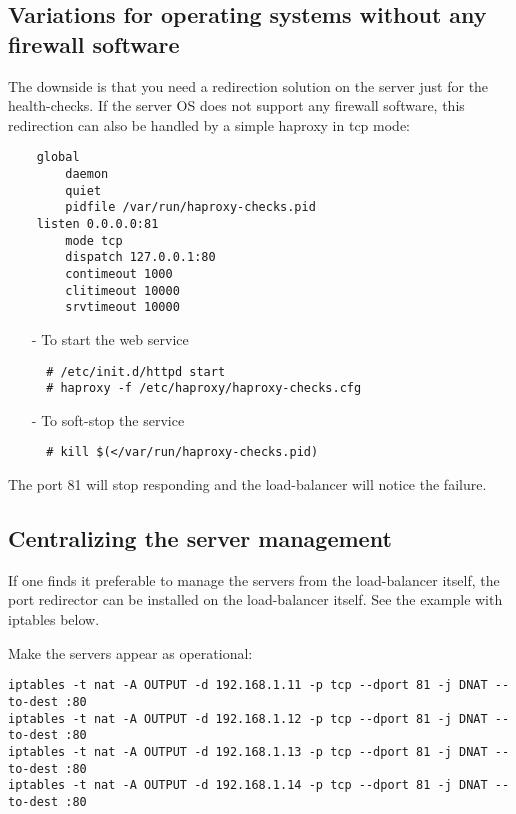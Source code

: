 \subsection{Variations for operating systems without any firewall software}

The downside is that you need a redirection solution on the server just for
the health-checks. If the server OS does not support any firewall software,
this redirection can also be handled by a simple haproxy in tcp mode:

\begin{verbatim}
    global
        daemon
        quiet
        pidfile /var/run/haproxy-checks.pid
    listen 0.0.0.0:81
        mode tcp
        dispatch 127.0.0.1:80
        contimeout 1000
        clitimeout 10000
        srvtimeout 10000
\end{verbatim}

\begin{itemize}
\item[-] To start the web service
\begin{verbatim}
  # /etc/init.d/httpd start
  # haproxy -f /etc/haproxy/haproxy-checks.cfg
\end{verbatim}
\item[-] To soft-stop the service
\begin{verbatim}
  # kill $(</var/run/haproxy-checks.pid)
\end{verbatim}
\end{itemize}

The port 81 will stop responding and the load-balancer will notice the failure.

\subsection{Centralizing the server management}

If one finds it preferable to manage the servers from the load-balancer itself,
the port redirector can be installed on the load-balancer itself. See the
example with iptables below.

Make the servers appear as operational:
\begin{verbatim}
iptables -t nat -A OUTPUT -d 192.168.1.11 -p tcp --dport 81 -j DNAT --to-dest :80
iptables -t nat -A OUTPUT -d 192.168.1.12 -p tcp --dport 81 -j DNAT --to-dest :80
iptables -t nat -A OUTPUT -d 192.168.1.13 -p tcp --dport 81 -j DNAT --to-dest :80
iptables -t nat -A OUTPUT -d 192.168.1.14 -p tcp --dport 81 -j DNAT --to-dest :80
\end{verbatim}

